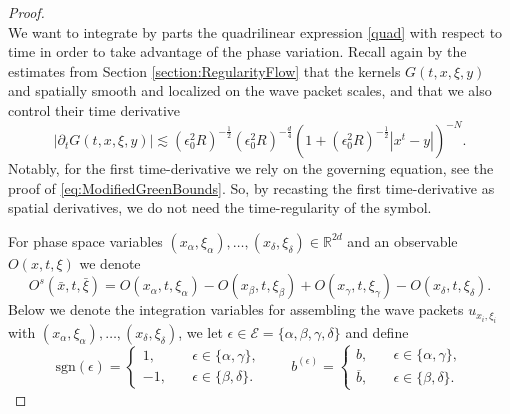 \documentclass{amsart}
\theoremstyle{definition}
\newcommand{\R}{\mathbb{R}}
\begin{document}
\begin{proof}
\begin{equation*}
\end{equation*}
We want to integrate by parts the quadrilinear expression \eqref{quad} with respect to time in order to take advantage of the phase variation.
Recall again by the estimates from Section \ref{section:RegularityFlow} that
the kernels $G(t,x,\xi,y)$ 
and spatially smooth and  localized on the wave packet scales, and that we also control their time derivative
\begin{equation} 
\label{eq:PointwiseBoundG}
    |\partial_t G(t,x,\xi,y)| \lesssim (\epsilon_0^2 R)^{-\frac{1}{2}} (\epsilon_0^2 R)^{-\frac{d}{4}} (1+ (\epsilon_0^2 R)^{-\frac{1}{2}} |x^t - y|)^{-N}.
\end{equation}
Notably, for the first time-derivative we rely on the governing equation, see the proof of \eqref{eq:ModifiedGreenBounds}. So, by recasting the first time-derivative as spatial derivatives, we do not need the time-regularity of the symbol.

For phase space variables $(x_\alpha,\xi_\alpha), \ldots, (x_\delta,\xi_\delta) \in \R^{2d}$ and an observable $O(x,t,\xi)$ we denote
\begin{equation*}
    O^s(\bar{x},t,\bar{\xi}) = O(x_\alpha,t,\xi_\alpha) - O(x_{\beta},t,\xi_{\beta}) + O(x_{\gamma},t,\xi_{\gamma}) - O(x_{\delta},t,\xi_{\delta}).
\end{equation*}
Below we denote the integration variables for assembling the wave packets $u_{x_i,\xi_i}$ with $(x_{\alpha},\xi_{\alpha}), \ldots, (x_{\delta},\xi_{\delta})$, we let $\epsilon \in \mathcal{E} = \{ \alpha, \beta, \gamma, \delta\}$ and define 
\begin{equation*}
    \text{sgn}(\epsilon) = 
    \begin{cases}
        1, &\quad \epsilon \in \{ \alpha, \gamma \}, \\
        -1, &\quad \epsilon \in \{\beta, \delta\}.
    \end{cases}
    \qquad 
        b^{(\epsilon)} = \begin{cases}
        b, &\quad \epsilon \in \{ \alpha, \gamma \}, \\
        \overline{b}, &\quad \epsilon \in \{\beta, \delta \}.
    \end{cases}
\end{equation*}


\end{proof}
\end{document}
